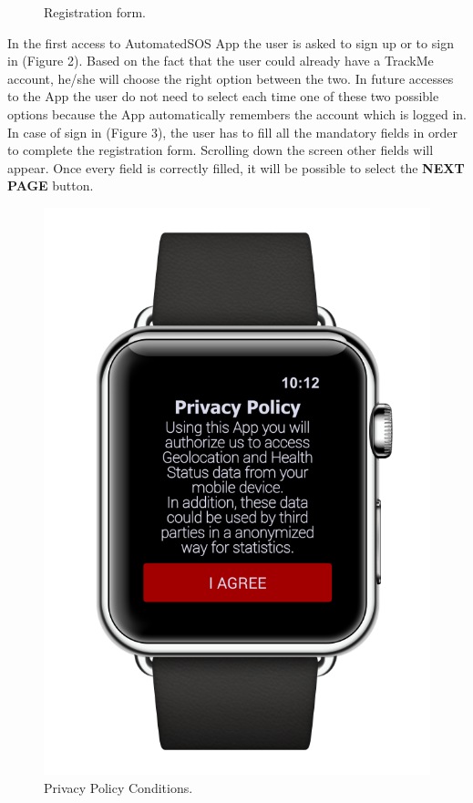 \begin{enumerate}
\begin{figure}[H]
\begin{center}
\begin{minipage}[c]{.40\textwidth}
          	\caption{Registration form.}
        \end{minipage}
      \end{center}
\end{figure}
In the first access to AutomatedSOS App the user is asked to sign up or to sign in 			(Figure 2). Based on the fact that the user could already have a TrackMe account, he/she will choose the right option between the two. In future accesses to the App the user do not need to select each time one of these two possible options because the App automatically remembers the account which is logged in. In case of sign in (Figure 3), the user has to fill all the mandatory fields in order to complete the registration form. Scrolling down the screen other fields will appear. Once every field is correctly filled, it will be possible to select the \textbf{NEXT PAGE} button. 
\clearpage
\begin{figure}[H]
\begin{center}
        \begin{minipage}[c]{.40\textwidth}
        \centering
          \includegraphics[height=12 cm]{Images/Mockups/AutomatedSOSMockup2.png}
             	\caption{Privacy Policy Conditions.}
        \end{minipage}%
        \hspace{10mm}%
        \begin{minipage}[c]{.40\textwidth}
        \centering

\end{minipage}
\end{center}
\end{figure}
\end{enumerate}
